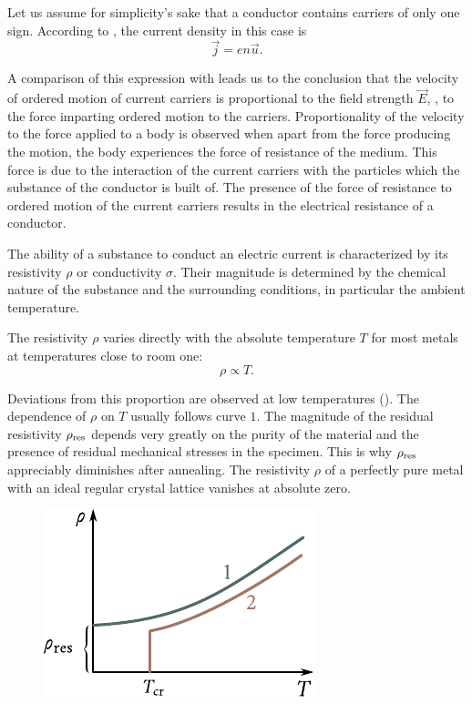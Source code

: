 Let us assume for simplicity's sake that a conductor contains carriers of only one sign. According to , the current density in this case is
\begin{equation}\label{eq:5_23}
    \vec{j} = e n \vec{u}.
\end{equation}

\noindent
A comparison of this expression with  leads us to the conclusion that the velocity of ordered motion of current carriers is proportional to the field strength $\vec{E}$, \ie, to the force imparting ordered motion to the carriers. Proportionality of the velocity to the force applied to a body is observed when apart from the force producing the motion, the body experiences the force of resistance of the medium. This force is due to the interaction of the current carriers with the particles which the substance of the conductor is built of. The presence of the force of resistance to ordered motion of the current carriers results in the electrical resistance of a conductor.

The ability of a substance to conduct an electric current is characterized by its resistivity $\rho$ or conductivity $\sigma$. Their magnitude is determined by the chemical nature of the substance and the surrounding conditions, in particular the ambient temperature.

The resistivity $\rho$ varies directly with the absolute temperature $T$ for most metals at temperatures close to room one:
\begin{equation}\label{eq:5_24}
    \rho \propto T.
\end{equation}

\noindent
Deviations from this proportion are observed at low temperatures (). The dependence of $\rho$ on $T$ usually follows curve $1$. The magnitude of the residual resistivity $\rho_{\text{res}}$ depends very greatly on the purity of the material and the presence of residual mechanical stresses in the specimen. This is why $\rho_{\text{res}}$ appreciably diminishes after annealing. The resistivity $\rho$ of a perfectly pure metal with an ideal regular crystal lattice vanishes at absolute zero.

\begin{figure}[t]
	\begin{center}
		\includegraphics[scale=1]{figures/ch_05/fig_5_5.pdf}
		\caption[]{}
		\label{fig:5_5}
	\end{center}
	\vspace{-0.8cm}
\end{figure}

